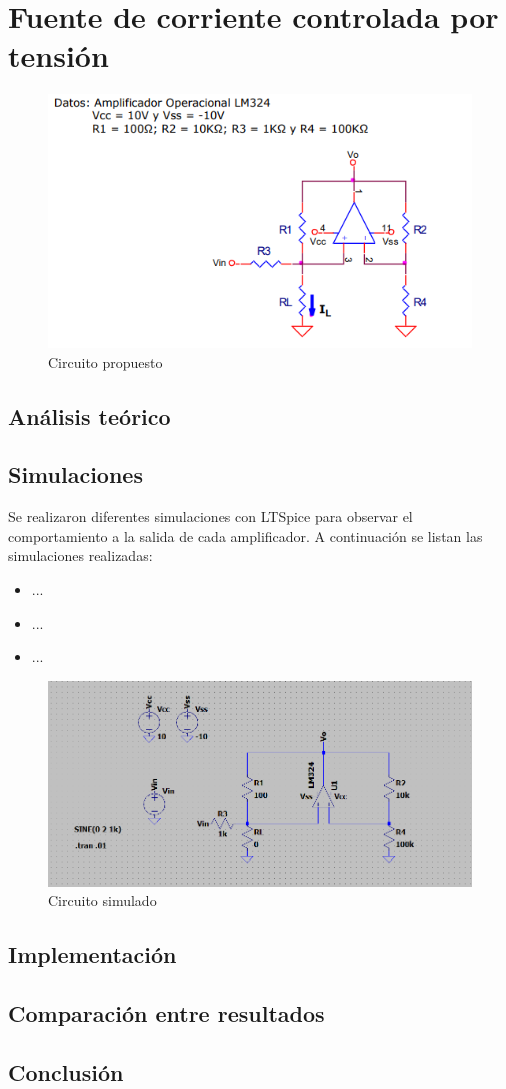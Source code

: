 \newpage
\section{Fuente de corriente controlada por tensión}
\onehalfspacing
\begin{figure}[htb]
	\centering
	\includegraphics[width=1\textwidth]{figuras/circuito2_consigna.png}
	\caption{Circuito propuesto}
\end{figure}
\subsection{Análisis teórico}



\subsection{Simulaciones}
Se realizaron diferentes simulaciones con LTSpice para observar el comportamiento a la salida de cada amplificador. A continuación se listan las simulaciones realizadas:
\begin{itemize}
	\item ...
	\item ...
	\item ...
\end{itemize}
\begin{figure}[H]
	\centering
	\includegraphics[width=1\textwidth]{figuras/circuito2.png}
	\caption{Circuito simulado}
\end{figure}

\subsection{Implementación}


\subsection{Comparación entre resultados}

\subsection{Conclusión}
 